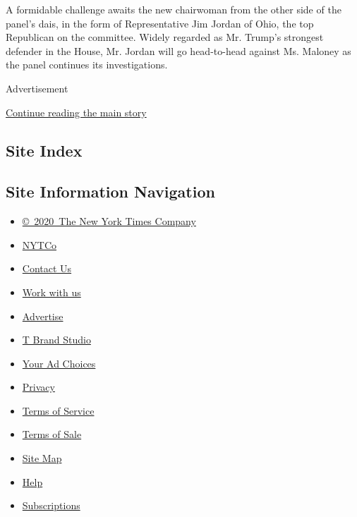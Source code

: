 A formidable challenge awaits the new chairwoman from the other side of
the panel's dais, in the form of Representative Jim Jordan of Ohio, the
top Republican on the committee. Widely regarded as Mr. Trump's
strongest defender in the House, Mr. Jordan will go head-to-head against
Ms. Maloney as the panel continues its investigations.

Advertisement

\protect\hyperlink{after-bottom}{Continue reading the main story}

\hypertarget{site-index}{%
\subsection{Site Index}\label{site-index}}

\hypertarget{site-information-navigation}{%
\subsection{Site Information
Navigation}\label{site-information-navigation}}

\begin{itemize}
\tightlist
\item
  \href{https://help.nytimes.com/hc/en-us/articles/115014792127-Copyright-notice}{©~2020~The
  New York Times Company}
\end{itemize}

\begin{itemize}
\tightlist
\item
  \href{https://www.nytco.com/}{NYTCo}
\item
  \href{https://help.nytimes.com/hc/en-us/articles/115015385887-Contact-Us}{Contact
  Us}
\item
  \href{https://www.nytco.com/careers/}{Work with us}
\item
  \href{https://nytmediakit.com/}{Advertise}
\item
  \href{http://www.tbrandstudio.com/}{T Brand Studio}
\item
  \href{https://www.nytimes.com/privacy/cookie-policy\#how-do-i-manage-trackers}{Your
  Ad Choices}
\item
  \href{https://www.nytimes.com/privacy}{Privacy}
\item
  \href{https://help.nytimes.com/hc/en-us/articles/115014893428-Terms-of-service}{Terms
  of Service}
\item
  \href{https://help.nytimes.com/hc/en-us/articles/115014893968-Terms-of-sale}{Terms
  of Sale}
\item
  \href{https://spiderbites.nytimes.com}{Site Map}
\item
  \href{https://help.nytimes.com/hc/en-us}{Help}
\item
  \href{https://www.nytimes.com/subscription?campaignId=37WXW}{Subscriptions}
\end{itemize}
